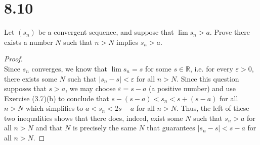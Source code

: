 \documentclass[10pt,a4paper]{article}
\theoremstyle{definition}
\begin{document}
\section*{8.10}
Let $(s_n)$ be a convergent sequence, and suppose that $\lim s_n > a$. Prove there exists a number $N$ such that $n > N$ implies $s_n > a$.

\begin{proof}{$ $}
\\Since $s_n$ converges, we know that $\lim s_n = s$ for some $s \in \mathbb{R}$, i.e. for every $\varepsilon > 0$, there exists some $N$ such that $|s_n - s| < \varepsilon$ for all $n > N$. Since this question supposes that $s > a$, we may choose $\varepsilon = s - a$ (a positive number) and use Exercise (3.7)(b) to conclude that $s - (s - a) < s_n < s + (s - a)$ for all $n > N$ which simplifies to $a < s_n < 2s - a$ for all $n > N$. Thus, the left of these two inequalities shows that there does, indeed, exist some $N$ such that $s_n > a$ for all $n > N$ and that $N$ is precisely the same $N$ that guarantees $|s_n - s| < s - a$ for all $n > N$. 
\end{proof}
\end{document}

